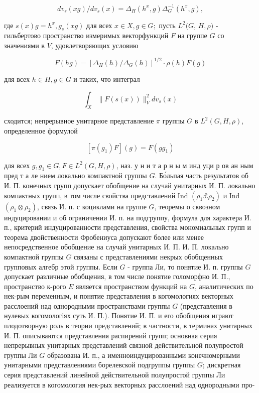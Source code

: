 \documentclass[10pt]{article}
\begin{document}
\[

d v_{s}(x g) / d v_{s}(x)=\Delta_{H}\left(h^{x}, g\right) \Delta_{G}^{-1}\left(h^{x}, g\right),

\]



где $s(x) g=h^{x}, g_{s}(x g)$ для всех $x \in X, g \in G ;$ пусть $L^{2}(G$, $H, \rho)$ - гильбертово пространство измеримых векторфункций $F$ на группе $G$ со значениями в $V$, удовлетворяющих условию



\[

F(h g)=\left[\Delta_{H}(h) / \Delta_{G}(h)\right]^{1 / 2} \cdot \rho(h) F(g)

\]



для всех $h \in H, g \in G$ и таких, что интеграл



\[

\int_{X}\|F(s(x))\|_{V}^{2} d v_{s}(x)

\]



сходится; непрерывное унитарное представление $\pi$ группы $G$ в $L^{2}(G, H, \rho)$, определенное формулой



\[

\left[\pi\left(g_{1}\right) F\right](g)=F\left(g g_{1}\right)

\]



для всех $g, g_{1} \in G, F \in L^{2}(G, H, \rho)$, наз. у н и т а р н ы м инд уци р ов ан ным пред т а ле нием локально компактной группы $G$. Бо́льпая часть результатов об И. П. конечных групп допускает обобщение на случай унитарных И. П. локально компактных групп, в том числе свойства представлений Ind $\left(\rho_{1} \pounds \rho_{2}\right)$ и Ind $\left(\rho_{1} \otimes \rho_{2}\right)$, связь И. п. с коциклами на группе $G$, теоремы о сквозном индуцировании и об ограничении И. п. на подгруппу, формула для характера И. п., критерий индуцированности представления, свойства мономиальных групп и теорема двойственности Фробениуса допускают более или менее непосредственное обобщение на случай унитарных И. П. И. П. локально компактной группы $G$ связаны с представлениями некрых обобщенных групповых алгебр этой группы. Если $G$ - группа Ли, то понятие И. п. группы $G$ допускает различные обобщения, в том числе понятие голоморфно И. П., пространство к-рого $E$ является пространством функций на $G$, аналитических по нек-рым переменным, и понятие представления в когомологиях векторных расслоений над однородными пространствами группы $G$ (представления в нулевых когомологіях суть И. П.). Понятие И. П. и его обобщения играют плодотворную роль в теории представлений; в частности, в терминах унитарных И. П. описываются представления распирений групп; основная серия непрерывных унитарных представлений связной действительной полупростой группы Ли $G$ образована И. п., а именноиндуцированными конечномерными унитарными представлениями борелевской подгруппы группы $G$; дискретная серия представлений линейной действительной полупростой группы Ли реализуется в когомология нек-рых векторных расслоений над однородными про-
\end{document}
